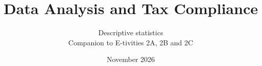 \documentclass[aspectratio=169,11pt]{beamer}
\title{Data Analysis and Tax Compliance}
\subtitle{Descriptive statistics\\Companion to E-tivities 2A, 2B and 2C}
\date{November 2026}
\begin{document}
\begin{frame}[plain]\titlepage\end{frame}

\end{document}
